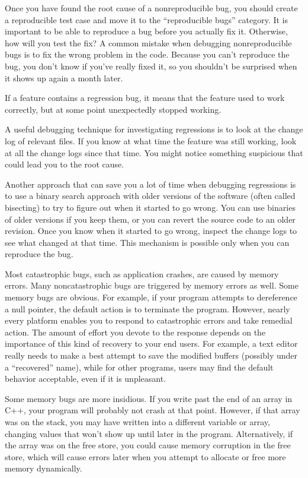 Once you have found the root cause of a nonreproducible bug, you should create a reproducible test case and move it to the “reproducible bugs” category. It is important to be able to reproduce a bug before you actually fix it. Otherwise, how will you test the fix? A common mistake when debugging nonreproducible bugs is to fix the wrong problem in the code. Because you can’t reproduce the bug, you don’t know if you’ve really fixed it, so you shouldn’t be surprised when it shows up again a month later.


If a feature contains a regression bug, it means that the feature used to work correctly, but at some point unexpectedly stopped working.

A useful debugging technique for investigating regressions is to look at the change log of relevant files. If you know at what time the feature was still working, look at all the change logs since that time. You might notice something suspicious that could lead you to the root cause.

Another approach that can save you a lot of time when debugging regressions is to use a binary search approach with older versions of the software (often called bisecting) to try to figure out when it started to go wrong. You can use binaries of older versions if you keep them, or you can revert the source code to an older revision. Once you know when it started to go wrong, inspect the change logs to see what changed at that time. This mechanism is possible only when you can reproduce the bug.


Most catastrophic bugs, such as application crashes, are caused by memory errors. Many noncatastrophic bugs are triggered by memory errors as well. Some memory bugs are obvious. For example, if your program attempts to dereference a null pointer, the default action is to terminate the program. However, nearly every platform enables you to respond to catastrophic errors and take remedial action. The amount of effort you devote to the response depends on the importance of this kind of recovery to your end users. For example, a text editor really needs to make a best attempt to save the modified buffers (possibly under a “recovered” name), while for other programs, users may find the default behavior acceptable, even if it is unpleasant.

Some memory bugs are more insidious. If you write past the end of an array in C++, your program will probably not crash at that point. However, if that array was on the stack, you may have written into a different variable or array, changing values that won’t show up until later in the program. Alternatively, if the array was on the free store, you could cause memory corruption in the free store, which will cause errors later when you attempt to allocate or free more memory dynamically.

